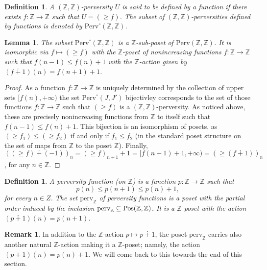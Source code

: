 \documentclass{article}
\newtheorem{lem}[thm]{Lemma}
\newtheorem{defn}[thm]{Definition}
\theoremstyle{definition}
\newtheorem{rem}[thm]{Remark}
\newcommand{\Z}{\mathbb{Z}}
\newcommand{\pos}{\textnormal{Pos}}
\begin{document}
\begin{defn}
A $(\Z,\Z)$-perversity $U$ is said to be defined by a function if there exists $f\colon \Z\to \Z$ such that $U=(\geq f)$. The subset of $(\Z,\Z)$-perversities defined by functions is denoted by $\mathrm{Perv}^\circ(\Z,\Z)$.
\end{defn}
\begin{lem}\label{lemma.perv0}
The subset $\mathrm{Perv}^\circ(\Z,\Z)$ is a $\Z$-sub-poset of $\mathrm{Perv}(\Z,\Z)$. It is isomorphic via $f\mapsto (\geq f)$ with the $\Z$-poset of nonincreasing functions $f\colon \Z\to \Z$ such that $f(n-1)\leq f(n)+1$ with the $\Z$-action given by $(f\dotplus 1)(n)=f(n+1)+1$.
\end{lem}
\begin{proof}
As a function $f\colon \Z\to \Z$ is uniquely determined by the collection of upper sets $[f(n),+\infty)$ the set $\mathrm{Perv}^\circ(J,J')$ bijectivley corresponds to the set of those functions $f\colon \Z\to \Z$ such that $(\geq f)$ is a $(\Z,\Z)$-perversity. As noticed above, these are precisely nonincreasing functions from $\Z$ to itself such that  $f(n-1)\leq f(n)+1$. This bijection is an isomorphism of posets, as $(\geq f_1)\leq (\geq f_2)$ if and only if $f_1\leq f_2$ (in the standard poset structure on the set of maps from $\Z$ to the poset $\Z$). Finally, $((\geq f)\dotplus (-1))_n=(\geq f)_{n+1}+1=[f(n+1)+1,+\infty)=(\geq (f\dotplus 1))_n$, for any $n\in \Z$.
\end{proof}

\begin{defn}
A \emph{perversity function} (on $\Z$) is a function $p\colon \Z\to \Z$ such that
\[
p(n)\leq p(n+1)\leq p(n)+1,
\]
for every $n\in Z$. The set $\mathrm{perv}_\Z$ of perversity functions is a poset with the partial order induced by the inclusion $\mathrm{perv}_\Z\subseteq \pos(\Z,\Z)$. It is a $\Z$-poset with the action $(p\dotplus1)(n)=p(n+1)$. 
\end{defn}
\begin{rem}\label{other-action}
In addition to the $\Z$-action $p\mapsto p\dotplus 1$, the poset  $\mathrm{perv}_\Z$ carries also another natural $\Z$-action making it a $\Z$-poset; namely, the action $(p+1)(n)=p(n)+1$. We will come back to this towards the end of this section.
\end{rem}
\end{document}

